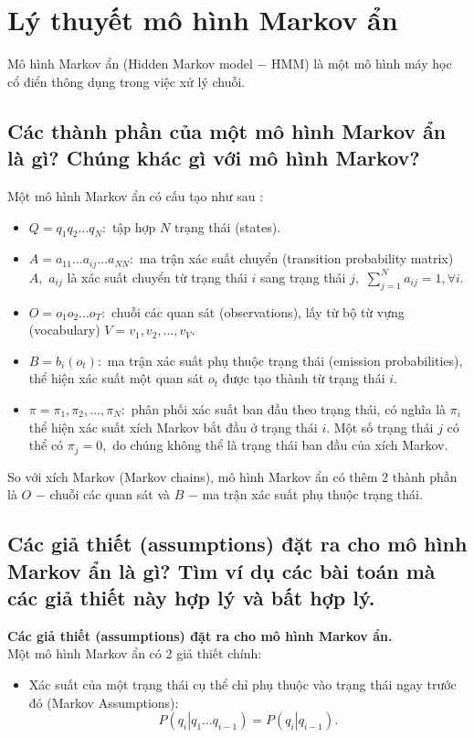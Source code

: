 \section{Lý thuyết mô hình Markov ẩn}
Mô hình Markov ẩn (Hidden Markov model $-$ HMM) là một mô hình máy học cổ điển thông dụng trong việc xử lý chuỗi.
\subsection{Các thành phần của một mô hình Markov ẩn là gì? Chúng khác gì với mô hình Markov?}
Một mô hình Markov ẩn có cấu tạo như sau \supercite{angrybird, hmm2021}:
\begin{mybox}
\begin{itemize}
\item $Q = {q_1}{q_2} \ldots {q_N}:$ tập hợp $N$ trạng thái (states).
\item $A = {a_{11}} \ldots {a_{ij}} \ldots {a_{NN}}:$ ma trận xác suất chuyển (transition probability matrix) $A,$ $a_{ij}$ là xác suất chuyển từ trạng thái $i$ sang trạng thái $j,$ $\sum\limits_{j = 1}^N {{a_{ij}}}  = 1,\forall i.$
\item $O = {o_1}{o_2} \ldots {o_T}:$ chuỗi các quan sát (observations), lấy từ bộ từ vựng (vocabulary) $V = {v_1}, {v_2}, \ldots, {v_V}.$
\item $B = b_i \left( {o_t} \right):$ ma trận xác suất phụ thuộc trạng thái (emission probabilities), thể hiện xác suất một quan sát $o_t$ được tạo thành từ trạng thái $i.$
\item $\pi = {\pi_1}, {\pi_2}, \ldots, {\pi_N}:$ phân phối xác suất ban đầu theo trạng thái, có nghĩa là $\pi_i$ thể hiện xác suất xích Markov bắt đầu ở trạng thái $i.$ Một số trạng thái $j$ có thể có $\pi_j = 0,$ do chúng không thể là trạng thái ban đầu của xích Markov.
\end{itemize}
\end{mybox}
So với xích Markov (Markov chains), mô hình Markov ẩn có thêm 2 thành phần là $O$ $-$ chuỗi các quan sát và $B$ $-$ ma trận xác suất phụ thuộc trạng thái.

\subsection{Các giả thiết (assumptions) đặt ra cho mô hình Markov ẩn là gì? Tìm ví dụ các bài toán mà các giả thiết này hợp lý và bất hợp lý.}
\textbf{Các giả thiết (assumptions) đặt ra cho mô hình Markov ẩn.}\\
Một mô hình Markov ẩn có 2 giả thiết chính:
\begin{itemize}
\item Xác suất của một trạng thái cụ thể chỉ phụ thuộc vào trạng thái ngay trước đó (Markov Assumptions):
\begin{equation}
P\left( {\left. {{q_i}} \right|{q_1} \ldots {q_{i - 1}}} \right) = P\left( {\left. {{q_i}} \right|{q_{i - 1}}} \right).
\end{equation}

\end{itemize}

